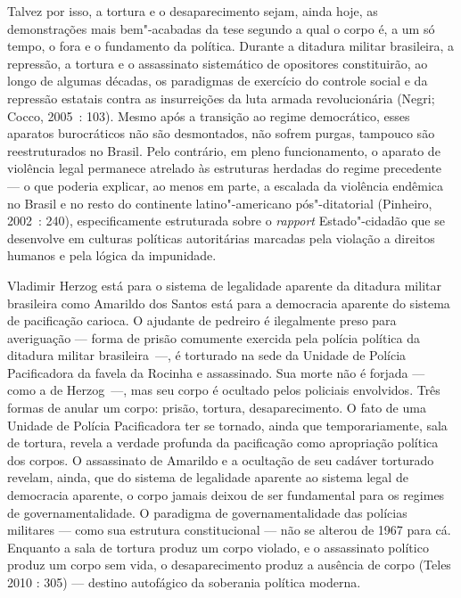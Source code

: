 Talvez por isso, a tortura e o desaparecimento sejam, ainda hoje, as
demonstrações mais bem"-acabadas da tese segundo a qual o corpo é, a um
só tempo, o fora e o fundamento da política. Durante a ditadura militar
brasileira, a repressão, a tortura e o assassinato sistemático de
opositores constituirão, ao longo de algumas décadas, os paradigmas de
exercício do controle social e da repressão estatais contra as
insurreições da luta armada revolucionária (Negri; Cocco, 2005~: 103).
Mesmo após a transição ao regime democrático, esses aparatos
burocráticos não são desmontados, não sofrem purgas, tampouco são
reestruturados no Brasil. Pelo contrário, em pleno funcionamento, o
aparato de violência legal permanece atrelado às estruturas herdadas do
regime precedente --- o que poderia explicar, ao menos em parte, a
escalada da violência endêmica no Brasil e no resto do continente
latino"-americano pós"-ditatorial (Pinheiro, 2002~: 240), especificamente
estruturada sobre o \emph{rapport }Estado"-cidadão que se desenvolve em
culturas políticas autoritárias marcadas pela violação a direitos
humanos e pela lógica da impunidade.

Vladimir Herzog está para o sistema de legalidade aparente da ditadura
militar brasileira como Amarildo dos Santos está para a democracia
aparente do sistema de pacificação carioca. O ajudante de pedreiro é
ilegalmente preso para averiguação --- forma de prisão comumente exercida
pela polícia política da ditadura militar brasileira~---, é torturado na
sede da Unidade de Polícia Pacificadora da favela da Rocinha e
assassinado. Sua morte não é forjada --- como a de Herzog~---, mas seu
corpo é ocultado pelos policiais envolvidos. Três formas de anular um
corpo: prisão, tortura, desaparecimento. O fato de uma Unidade de
Polícia Pacificadora ter se tornado, ainda que temporariamente, sala de
tortura, revela a verdade profunda da pacificação como apropriação
política dos corpos. O assassinato de Amarildo e a ocultação de seu
cadáver torturado revelam, ainda, que do sistema de legalidade aparente
ao sistema legal de democracia aparente, o corpo jamais deixou de ser
fundamental para os regimes de governamentalidade. O paradigma de
governamentalidade das polícias militares --- como sua estrutura
constitucional --- não se alterou de 1967 para cá. Enquanto a sala de
tortura produz um corpo violado, e o assassinato político produz um
corpo sem vida, o desaparecimento produz a ausência de corpo (Teles 2010
: 305) --- destino autofágico da soberania política moderna.

